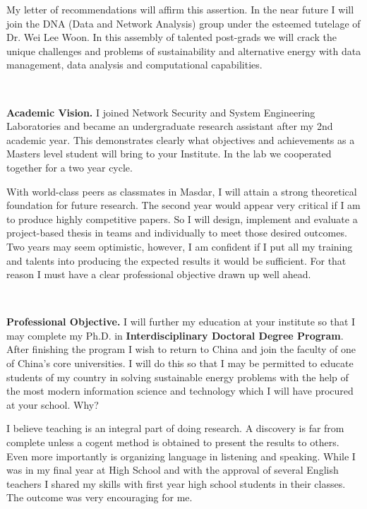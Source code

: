 \documentclass[a4paper]{article}
\begin{document}
\par
My letter of recommendations will affirm this assertion. In the near future I will join the DNA (Data and Network Analysis) group under the esteemed tutelage of Dr. Wei Lee Woon. In this assembly of talented post-grads we will crack the unique challenges and problems of sustainability and alternative energy with data management, data analysis and computational capabilities.
\par
~
\par
\noindent \textbf{Academic Vision.} I joined Network Security and System Engineering Laboratories and became an undergraduate research assistant after my 2nd academic year. This demonstrates clearly what objectives and achievements as a Masters level student will bring to your Institute. In the lab we cooperated together for a two year cycle.
\par
With world-class peers as classmates in Masdar, I will attain a strong theoretical foundation for future research. The second year would appear very critical if I am to produce highly competitive papers. So I will design, implement and evaluate a project-based thesis in teams and individually to meet those desired outcomes. Two years may seem optimistic, however, I am confident if I put all my training and talents into producing the expected results it would be sufficient. For that reason I must have a clear professional objective drawn up well ahead.
\par
~
\par
\noindent \textbf{Professional Objective.} I will further my education at your institute so that I may complete my Ph.D. in \textbf{Interdisciplinary Doctoral Degree Program}. After finishing the program I wish to return to China and join the faculty of one of China's core universities. I will do this so that I may be permitted to educate students of my country in solving sustainable energy problems with the help of the most modern information science and technology which I will have procured at your school. Why?
\par
I believe teaching is an integral part of doing research. A discovery is far from complete unless a cogent method is obtained to present the results to others. Even more importantly is organizing language in listening and speaking. While I was in my final year at High School and with the approval of several English teachers I shared my skills with first year high school students in their classes. The outcome was very encouraging for me.
\par
\end{document}
